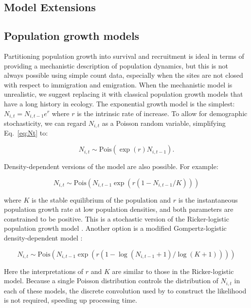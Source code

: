 \documentclass[12pt,english]{article}
\begin{document}
\begin{spacing}{1.9}
\begin{flushleft}
\section*{Model Extensions}
\label{sec:ext}
\subsection*{Population growth models}
\begin{samepage}
Partitioning population growth into survival and recruitment
is ideal in terms of providing a mechanistic description of population
dynamics, but this is not always possible using simple count data,
especially when the sites are not closed with respect to immigration
and emigration. 
When the mechanistic model is unrealistic, we suggest replacing it
with classical population growth models that have a long history in ecology.
The exponential growth model is the simplest: 
$N_{i,t} = N_{i,t-1}e^r$ where $r$ is the intrinsic
rate of increase. 
To allow for demographic stochasticity, we can regard $N_{i,t}$ as a Poisson 
random variable, simplifying Eq.~\ref{eq:Nt} to:
\begin{linenomath*}
\begin{equation}
  N_{i,t} \sim \mathrm{Pois}(\exp(r)N_{i,t-1}).
\label{eq:exp}
\end{equation}
\end{linenomath*}

Density-dependent versions of the model are also possible.  For
example:
\begin{linenomath*}
\begin{equation}
  N_{i,t} \sim \mathrm{Pois}(N_{i,t-1}\exp(r(1-N_{i,t-1}/K)))
\label{eq:rick}
\end{equation}
\end{linenomath*}
where $K$ is the stable equilibrium of the population and $r$ is
the instantaneous population growth rate at low population
densities, and both parameters are constrained to be positive. This is
a stochastic version of the Ricker-logistic population growth model
\citep{ricker:1954}. Another option is a modified Gompertz-logistic
density-dependent model \citep{hart_gotelli:2011}:
\begin{linenomath*}
\begin{equation}
N_{i,t} \sim \mathrm{Pois}(N_{i,t-1}\exp(r(1-\log(N_{i,t-1}+1)/\log(K+1))))
\label{eq:gomp}
\end{equation}
\end{linenomath*}
Here the interpretations of $r$ and $K$ are similar to those in the
Ricker-logistic model. Because a single Poisson distribution controls
the distribution of $N_{i,t}$ in each of these models, the discrete 
convolution used by \citet{dail_madsen:2011} to construct the
likelihood is not required, speeding up processing time.
\end{samepage}



\end{flushleft}
\end{spacing}
\end{document}
